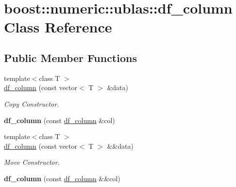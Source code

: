 \hypertarget{classboost_1_1numeric_1_1ublas_1_1df__column}{}\section{boost\+:\+:numeric\+:\+:ublas\+:\+:df\+\_\+column Class Reference}
\label{classboost_1_1numeric_1_1ublas_1_1df__column}
\subsection*{Public Member Functions}
\begin{DoxyCompactItemize}
\item 
{\footnotesize template$<$class T $>$ }\\\hyperlink{classboost_1_1numeric_1_1ublas_1_1df__column_a823796ec0d98231f2ee9b086b2c61939}{df\+\_\+column} (const vector$<$ T $>$ \&data)\hypertarget{classboost_1_1numeric_1_1ublas_1_1df__column_a823796ec0d98231f2ee9b086b2c61939}{}\label{classboost_1_1numeric_1_1ublas_1_1df__column_a823796ec0d98231f2ee9b086b2c61939}

\begin{DoxyCompactList}\small\item\em Copy Constructor. \end{DoxyCompactList}\item 
{\bfseries df\+\_\+column} (const \hyperlink{classboost_1_1numeric_1_1ublas_1_1df__column}{df\+\_\+column} \&col)\hypertarget{classboost_1_1numeric_1_1ublas_1_1df__column_a09d5a761b2f2ea3c15557a76e66040f3}{}\label{classboost_1_1numeric_1_1ublas_1_1df__column_a09d5a761b2f2ea3c15557a76e66040f3}

\item 
{\footnotesize template$<$class T $>$ }\\\hyperlink{classboost_1_1numeric_1_1ublas_1_1df__column_a41b4b0c0a2046d30ef669ba21bace5e4}{df\+\_\+column} (const vector$<$ T $>$ \&\&data)\hypertarget{classboost_1_1numeric_1_1ublas_1_1df__column_a41b4b0c0a2046d30ef669ba21bace5e4}{}\label{classboost_1_1numeric_1_1ublas_1_1df__column_a41b4b0c0a2046d30ef669ba21bace5e4}

\begin{DoxyCompactList}\small\item\em Move Constructor. \end{DoxyCompactList}\item 
{\bfseries df\+\_\+column} (const \hyperlink{classboost_1_1numeric_1_1ublas_1_1df__column}{df\+\_\+column} \&\&col)\hypertarget{classboost_1_1numeric_1_1ublas_1_1df__column_a7f661b526d05184e6ff2f1660725040a}{}\label{classboost_1_1numeric_1_1ublas_1_1df__column_a7f661b526d05184e6ff2f1660725040a}


\end{DoxyCompactItemize}
